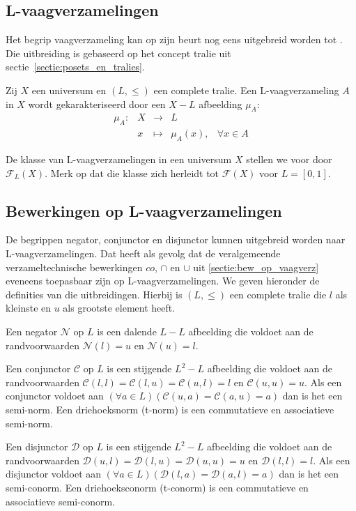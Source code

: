 \subsection{L-vaagverzamelingen}

Het begrip vaagverzameling kan op zijn beurt nog eens uitgebreid worden tot 
. Die uitbreiding is gebaseerd op het concept tralie
uit sectie~\ref{sectie:posets_en_tralies}.
\begin{definitie}
Zij $X$ een universum en $(L,\le)$ een complete tralie. Een L-vaagverzameling $A$ in $X$ wordt
gekarakteriseerd door een $X - L$ afbeelding $\mu_A$:
\begin{displaymath}
\begin{array}{lllll}
\mu_A: 	& X & \to 		& L	& \\
		& x & \mapsto 	& \mu_A(x),		& \forall x \in A
\end{array}
\end{displaymath}
\end{definitie}
\noindent
De klasse van L-vaagverzamelingen in een universum $X$ stellen we voor door 
$\mathcal{F}_L(X)$. Merk op dat die klasse zich herleidt tot $\mathcal{F}(X)$ voor $L = [0,1]$.

\subsection{Bewerkingen op L-vaagverzamelingen}

De begrippen negator, conjunctor en 
disjunctor kunnen uitgebreid worden naar L-vaag\-ver\-za\-me\-ling\-en. Dat heeft als 
gevolg dat de veralgemeende verzameltechnische bewerkingen $co$, $\cap$ en 
$\cup$ uit \ref{sectie:bew_op_vaagverz} eveneens toepasbaar zijn op L-vaagverzamelingen.
We geven hieronder de definities van die uitbreidingen.
Hierbij is $(L,\le)$ een complete tralie die $l$ als kleinste en $u$ als grootste element heeft.
\begin{definitie}
Een negator $\mathcal{N}$ op $L$ is een dalende $L - L$ afbeelding die voldoet
aan de randvoorwaarden $\mathcal{N}(l)=u$ en $\mathcal{N}(u)=l$. 
\end{definitie}
\begin{definitie}
Een conjunctor $\mathcal{C}$ op $L$ is een stijgende $L^2 - L$ afbeelding die voldoet aan de
randvoorwaarden $\mathcal{C}(l,l)=\mathcal{C}(l,u)=\mathcal{C}(u,l)=l$ en $\mathcal{C}(u,u)=u$. 
Als een conjunctor voldoet aan 
$(\forall a \in L)(\mathcal{C}(u,a)=\mathcal{C}(a,u)=a)$ dan is het een semi-norm.
Een driehoeksnorm (t-norm) is een commutatieve en associatieve semi-norm.
\end{definitie}
\begin{definitie}
Een disjunctor $\mathcal{D}$ op $L$ is een stijgende $L^2 - L$ afbeelding die voldoet
aan de randvoorwaarden $\mathcal{D}(u,l)=\mathcal{D}(l,u)=\mathcal{D}(u,u)=u$ en 
$\mathcal{D}(l,l)=l$. Als een disjunctor voldoet aan 
$(\forall a \in L)(\mathcal{D}(l,a)=\mathcal{D}(a,l)=a)$ dan is het een semi-conorm.
Een driehoeksconorm (t-conorm) is een commutatieve en associatieve semi-conorm.
\end{definitie}


